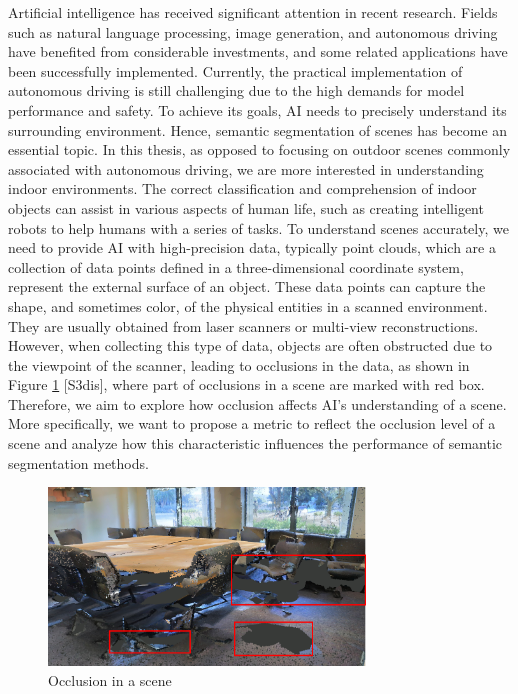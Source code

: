 \documentclass[11pt, a4paper,oneside,chapterprefix=false]{scrbook}
\begin{document}
Artificial intelligence has received significant attention in recent research. Fields such as natural language processing, image generation, and autonomous driving have benefited from considerable investments, and some related applications have been successfully implemented. Currently, the practical implementation of autonomous driving is still challenging due to the high demands for model performance and safety. To achieve its goals, AI needs to precisely understand its surrounding environment. Hence, semantic segmentation of scenes has become an essential topic. In this thesis, as opposed to focusing on outdoor scenes commonly associated with autonomous driving, we are more interested in understanding indoor environments. The correct classification and comprehension of indoor objects can assist in various aspects of human life, such as creating intelligent robots to help humans with a series of tasks. To understand scenes accurately, we need to provide AI with high-precision data, typically point clouds, which are a collection of data points defined in a three-dimensional coordinate system, represent the external surface of an object. These data points can capture the shape, and sometimes color, of the physical entities in a scanned environment. They are usually obtained from laser scanners or multi-view reconstructions. However, when collecting this type of data, objects are often obstructed due to the viewpoint of the scanner, leading to occlusions in the data, as shown in Figure \ref{fig:occlusion in a scene} [S3dis], where part of occlusions in a scene are marked with red box. Therefore, we aim to explore how occlusion affects AI's understanding of a scene. More specifically, we want to propose a metric to reflect the occlusion level of a scene and analyze how this characteristic influences the performance of semantic segmentation methods.


\begin{figure}[h]
    \centering
    \includegraphics*[width=0.75\textwidth]{figures/occlusion in conf2.png}
    \caption{Occlusion in a scene}
    \label{fig:occlusion in a scene}
\end{figure}
\end{document}
